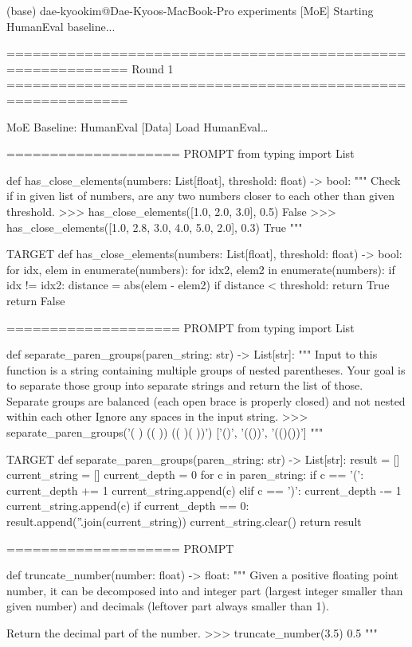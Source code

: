 (base) dae-kyookim@Dae-Kyoos-MacBook-Pro experiments %
[MoE] Starting HumanEval baseline...

============================================================
Round 1
============================================================

MoE Baseline: HumanEval
[Data] Load HumanEval…

====================
PROMPT
from typing import List


def has_close_elements(numbers: List[float], threshold: float) -> bool:
""" Check if in given list of numbers, are any two numbers closer to each other than
given threshold.
>>> has_close_elements([1.0, 2.0, 3.0], 0.5)
False
>>> has_close_elements([1.0, 2.8, 3.0, 4.0, 5.0, 2.0], 0.3)
True
"""


TARGET
def has_close_elements(numbers: List[float], threshold: float) -> bool: for idx, elem in enumerate(numbers): for idx2, elem2 in enumerate(numbers): if idx != idx2: distance = abs(elem - elem2) if distance < threshold: return True return False

====================
PROMPT
from typing import List


def separate_paren_groups(paren_string: str) -> List[str]:
""" Input to this function is a string containing multiple groups of nested parentheses. Your goal is to
separate those group into separate strings and return the list of those.
Separate groups are balanced (each open brace is properly closed) and not nested within each other
Ignore any spaces in the input string.
>>> separate_paren_groups('( ) (( )) (( )( ))')
['()', '(())', '(()())']
"""


TARGET
def separate_paren_groups(paren_string: str) -> List[str]: result = [] current_string = [] current_depth = 0 for c in paren_string: if c == '(': current_depth += 1 current_string.append(c) elif c == ')': current_depth -= 1 current_string.append(c) if current_depth == 0: result.append(''.join(current_string)) current_string.clear() return result

====================
PROMPT


def truncate_number(number: float) -> float:
""" Given a positive floating point number, it can be decomposed into
and integer part (largest integer smaller than given number) and decimals
(leftover part always smaller than 1).

Return the decimal part of the number.
>>> truncate_number(3.5)
0.5
"""


